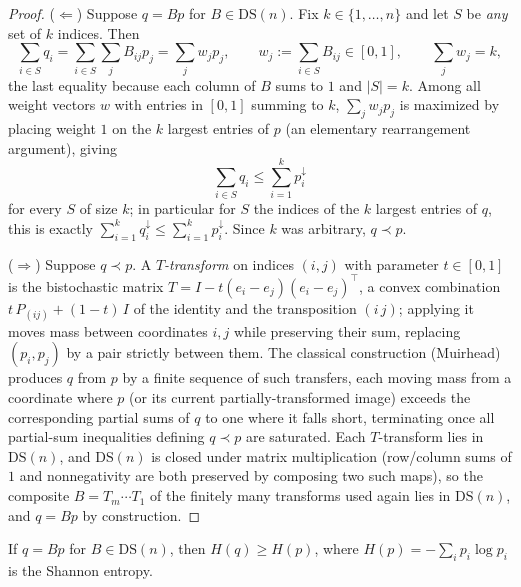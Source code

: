 \begin{proof}
($\Leftarrow$) Suppose $q = Bp$ for $B \in \mathrm{DS}(n)$. Fix $k \in
\{1,\dots,n\}$ and let $S$ be \emph{any} set of $k$ indices. Then
\begin{equation}
\sum_{i \in S} q_i = \sum_{i \in S} \sum_j B_{ij} p_j = \sum_j w_j p_j,
\qquad w_j := \sum_{i \in S} B_{ij} \in [0,1], \qquad \sum_j w_j = k,
\end{equation}
the last equality because each column of $B$ sums to $1$ and $|S|=k$. Among
all weight vectors $w$ with entries in $[0,1]$ summing to $k$, $\sum_j w_j p_j$
is maximized by placing weight $1$ on the $k$ largest entries of $p$ (an
elementary rearrangement argument), giving
\begin{equation}
\sum_{i \in S} q_i \le \sum_{i=1}^k p_i^\downarrow
\end{equation}
for every $S$ of size $k$; in particular for $S$ the indices of the $k$
largest entries of $q$, this is exactly $\sum_{i=1}^k q_i^\downarrow \le
\sum_{i=1}^k p_i^\downarrow$. Since $k$ was arbitrary, $q \prec p$.

($\Rightarrow$) Suppose $q \prec p$. A \emph{$T$-transform} on indices
$(i,j)$ with parameter $t \in [0,1]$ is the bistochastic matrix
$T = I - t(e_i-e_j)(e_i-e_j)^\top$, a convex combination $t\,P_{(ij)} +
(1-t)\,I$ of the identity and the transposition $(i\,j)$; applying it moves
mass between coordinates $i,j$ while preserving their sum, replacing $(p_i,
p_j)$ by a pair strictly between them. The classical construction (Muirhead)
produces $q$ from $p$ by a finite sequence of such transfers, each moving
mass from a coordinate where $p$ (or its current partially-transformed image)
exceeds the corresponding partial sums of $q$ to one where it falls short,
terminating once all partial-sum inequalities defining $q \prec p$ are
saturated. Each $T$-transform lies in $\mathrm{DS}(n)$, and $\mathrm{DS}(n)$
is closed under matrix multiplication (row/column sums of $1$ and
nonnegativity are both preserved by composing two such maps), so the composite
$B = T_m \cdots T_1$ of the finitely many transforms used again lies in
$\mathrm{DS}(n)$, and $q = Bp$ by construction.
\end{proof}

\begin{corollary}
\label{cor:entropy-increase}
If $q = Bp$ for $B \in \mathrm{DS}(n)$, then $H(q) \ge H(p)$, where $H(p) =
-\sum_i p_i \log p_i$ is the Shannon entropy.
\end{corollary}

